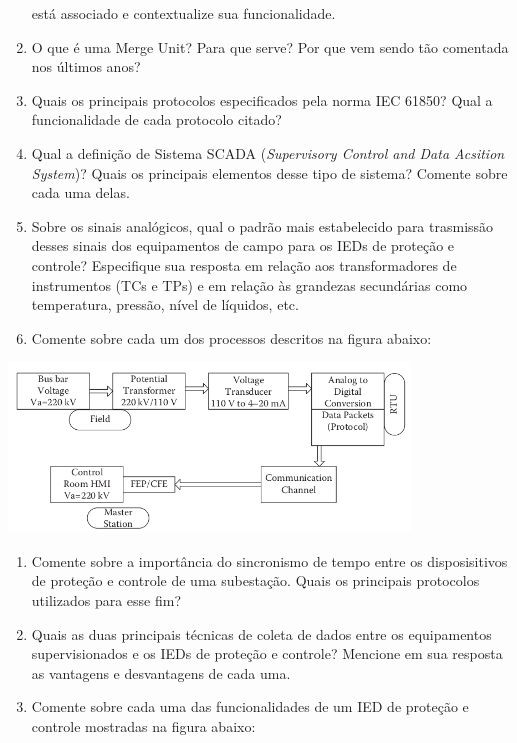 \begin{enumerate}
  está associado e contextualize sua funcionalidade.
\item
  O que é uma Merge Unit? Para que serve? Por que vem sendo tão
  comentada nos últimos anos?
\item
  Quais os principais protocolos especificados pela norma IEC 61850?
  Qual a funcionalidade de cada protocolo citado?
\item
  Qual a definição de Sistema SCADA (\emph{Supervisory Control and Data
  Acsition System})? Quais os principais elementos desse tipo de
  sistema? Comente sobre cada uma delas.
\item
  Sobre os sinais analógicos, qual o padrão mais estabelecido para
  trasmissão desses sinais dos equipamentos de campo para os IEDs de
  proteção e controle? Especifique sua resposta em relação aos
  transformadores de instrumentos (TCs e TPs) e em relação às grandezas
  secundárias como temperatura, pressão, nível de líquidos, etc.
\item
  Comente sobre cada um dos processos descritos na figura abaixo:
\end{enumerate}

\includegraphics[width=0.8\textwidth,height=\textheight]{Figuras/fig1.png}


\begin{enumerate}
\def\labelenumi{\arabic{enumi}.}
\setcounter{enumi}{12}
\item
  Comente sobre a importância do sincronismo de tempo entre os
  disposisitivos de proteção e controle de uma subestação. Quais os
  principais protocolos utilizados para esse fim?
\item
  Quais as duas principais técnicas de coleta de dados entre os
  equipamentos supervisionados e os IEDs de proteção e controle?
  Mencione em sua resposta as vantagens e desvantagens de cada uma.
\item
  Comente sobre cada uma das funcionalidades de um IED de proteção e
  controle mostradas na figura abaixo:
\end{enumerate}

